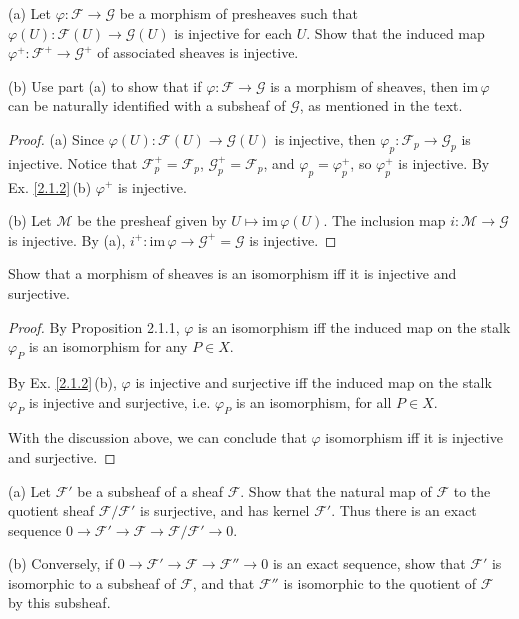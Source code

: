 \begin{exe}
	\label{2.1.4}
	(a) Let $\varphi :\mathscr{F} \rightarrow  \mathscr{G} $ be a morphism of presheaves such that $\varphi(U) :\mathscr{F}(U) \rightarrow  \mathscr{G}(U) $
	is injective for each $U$. Show that the induced map $\varphi^+ :\mathscr{F}^+ \rightarrow  \mathscr{G}^+ $ of associated sheaves
	is injective.
	
	(b) Use part (a) to show that if $\varphi :\mathscr{F} \rightarrow  \mathscr{G} $ is a morphism of sheaves,
	then $\mathrm{im}\,\varphi$ can be naturally identified with a subsheaf of $ \mathscr{G}$, as mentioned in the text.
\end{exe}

\begin{proof}
	(a) Since $\varphi(U) :\mathscr{F}(U) \rightarrow  \mathscr{G}(U) $ is injective, then $\varphi_p :\mathscr{F}_p \rightarrow  \mathscr{G}_p $ is injective.
	Notice that $\mathscr{F}_p^+=\mathscr{F}_p$, $\mathscr{G}_p^+=\mathscr{F}_p$, and $\varphi_p=\varphi_p^+$, so $\varphi_p^+$ is injective.
	By Ex. \ref{2.1.2}\,(b) $\varphi^+$ is injective.
	
	(b) Let $\mathscr{M}$ be the presheaf given by $U\mapsto\mathrm{im}\,\varphi(U)$. The inclusion map $i: \mathscr{M} \rightarrow  \mathscr{G}$ is injective. By (a), $i^+:\mathrm{im}\,\varphi \rightarrow  \mathscr{G}^+=\mathscr{G}$
	is injective.
\end{proof}
\begin{exe}
	\label{2.1.5}
	Show that a morphism of sheaves is an isomorphism iff it is injective and surjective.
\end{exe}

\begin{proof}
	By Proposition 2.1.1, $\varphi$ is an isomorphism iff the induced map on the stalk $\varphi_{P}$ is an isomorphism for any $P \in X$. 
	
	By Ex. \ref{2.1.2}\,(b), $\varphi$ is injective and surjective iff the induced map on the stalk $\varphi_{P}$ is injective and surjective, i.e. $\varphi_P$ is an isomorphism, for all $P \in X$.
	
	With the discussion above, we can conclude that $\varphi$ isomorphism iff it is injective and surjective.
\end{proof}

\begin{exe}
	\label{2.1.6}
	(a) Let $\mathscr{F}'$ be a subsheaf of a sheaf $\mathscr{F}$. Show that the natural map of $\mathscr{F}$ to the quotient sheaf $\mathscr{F}/\mathscr{F}'$ is surjective, and has kernel $\mathscr{F}'$. Thus there is an exact sequence $0 \rightarrow \mathscr{F}' \rightarrow \mathscr{F} \rightarrow \mathscr{F}/\mathscr{F}' \rightarrow 0$.
	
	(b) Conversely, if $0 \rightarrow \mathscr{F}' \rightarrow \mathscr{F} \rightarrow \mathscr{F}'' \rightarrow 0$ is an exact sequence, show that $\mathscr{F}'$ is isomorphic to a subsheaf of $\mathscr{F}$, and that $\mathscr{F}''$ is isomorphic to the quotient of $\mathscr{F}$ by this subsheaf.
\end{exe}

